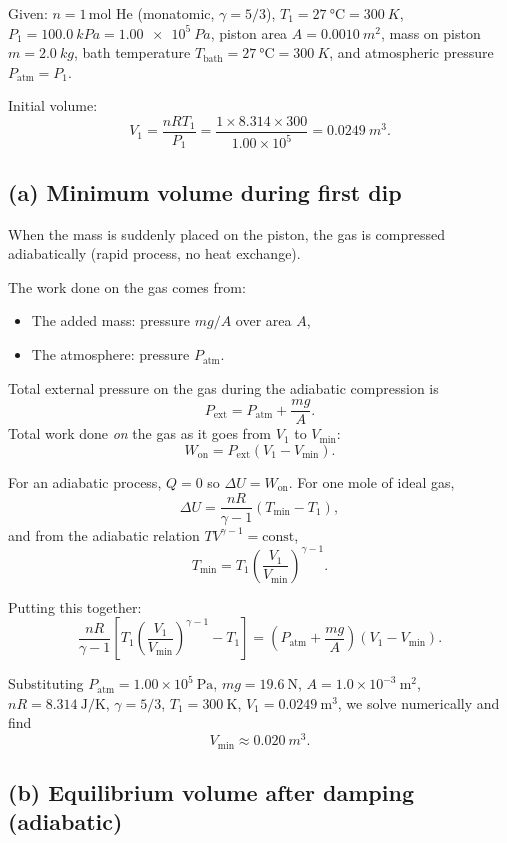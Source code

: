 \documentclass[11pt]{article}
\newcommand{\ans}[1]{\boxed{\displaystyle #1}}
\begin{document}
Given: \(n = 1\,\text{mol}\) He (monatomic, \(\gamma = 5/3\)),
\(T_1 = \SI{27}{\degreeCelsius} = \SI{300}{K}\),
\(P_1 = \SI{100.0}{kPa} = \SI{1.00e5}{Pa}\),
piston area \(A = \SI{0.0010}{m^2}\),
mass on piston \(m = \SI{2.0}{kg}\),
bath temperature \(T_{\text{bath}} = \SI{27}{\degreeCelsius} = \SI{300}{K}\),
and atmospheric pressure \(P_{\text{atm}} = P_1\).

Initial volume:
\[
V_1 = \frac{nRT_1}{P_1}
= \frac{1 \times 8.314 \times 300}{1.00 \times 10^5}
= \SI{0.0249}{m^3}.
\]

\subsection*{(a) Minimum volume during first dip}

When the mass is suddenly placed on the piston, the gas is compressed adiabatically (rapid process, no heat exchange).

The work done on the gas comes from:
\begin{itemize}
\item The added mass: pressure \(mg/A\) over area \(A\),
\item The atmosphere: pressure \(P_{\text{atm}}\).
\end{itemize}

Total external pressure on the gas during the adiabatic compression is
\[
P_{\text{ext}} = P_{\text{atm}} + \frac{mg}{A}.
\]
Total work done \emph{on} the gas as it goes from \(V_1\) to \(V_{\min}\):
\[
W_{\text{on}} = P_{\text{ext}} (V_1 - V_{\min}).
\]

For an adiabatic process, \(Q = 0\) so \(\Delta U = W_{\text{on}}\). For one mole of ideal gas,
\[
\Delta U = \frac{nR}{\gamma - 1} (T_{\min} - T_1),
\]
and from the adiabatic relation \(T V^{\gamma-1} = \text{const}\),
\[
T_{\min} = T_1 \left( \frac{V_1}{V_{\min}} \right)^{\gamma - 1}.
\]

Putting this together:
\[
\frac{nR}{\gamma-1}
\left[ T_1\left(\frac{V_1}{V_{\min}}\right)^{\gamma-1} - T_1 \right]
= \left(P_{\text{atm}} + \frac{mg}{A}\right)(V_1 - V_{\min}).
\]

Substituting \(P_{\text{atm}} = 1.00\times 10^5\ \text{Pa}\),
\(mg = 19.6\ \text{N}\),
\(A = 1.0\times 10^{-3}\ \text{m}^2\),
\(nR = 8.314\ \text{J/K}\),
\(\gamma = 5/3\),
\(T_1 = 300\ \text{K}\),
\(V_1 = 0.0249\ \text{m}^3\), we solve numerically and find
\[
V_{\min} \approx \ans{\SI{0.020}{m^3}}.
\]

\subsection*{(b) Equilibrium volume after damping (adiabatic)}
\end{document}
